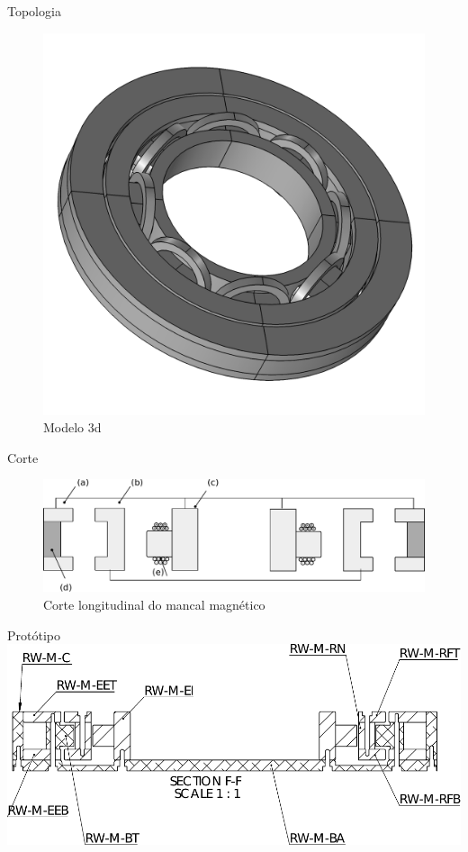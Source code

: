 \documentclass{beamer}
\begin{document}
\begin{frame}{Topologia}
\begin{figure}[th!]
\centering
	\includegraphics[width=0.8\linewidth]{../../Dissertacao/Figs/mancais/modelo-elementos-finitos.png}
\caption*{Modelo 3d}
\end{figure}
\end{frame}

\begin{frame}{Corte}
\begin{figure}[th!]
\centering
\includegraphics[width=1\linewidth]{mancais/mancal_corte2}
\caption*{Corte longitudinal do mancal magnético}


\end{figure}
\end{frame}

\begin{frame}{Protótipo}
\includegraphics[width=1\linewidth]{prototipo/corte}

\end{frame}
\end{document}
